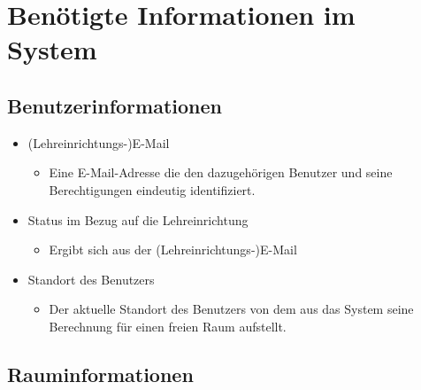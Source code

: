 
\section{Benötigte Informationen im System}
\label{sec:Benötigte_Informationen_im_System}

\subsection{Benutzerinformationen}
\label{sec:Benutzerinformationen}

\begin{itemize}
	\item (Lehreinrichtungs-)E-Mail
	\begin{itemize}
		\item Eine E-Mail-Adresse die den dazugehörigen Benutzer und seine Berechtigungen eindeutig identifiziert.
	\end{itemize}
	\item Status im Bezug auf die Lehreinrichtung
	\begin{itemize}
		\item Ergibt sich aus der (Lehreinrichtungs-)E-Mail
	\end{itemize}
	\item Standort des Benutzers
	\begin{itemize}
		\item Der aktuelle Standort des Benutzers von dem aus das System seine Berechnung für einen freien Raum aufstellt.
	\end{itemize}
\end{itemize}


\subsection{Rauminformationen}
\label{sec:Rauminformationen}

